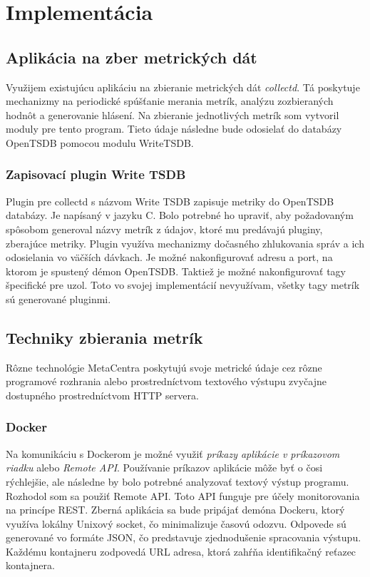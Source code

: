 \documentclass[12pt,twoside,color,cover,table]{fithesis3}
\begin{document}
\chapter{Implementácia}
\section{Aplikácia na zber metrických dát}
Využijem existujúcu aplikáciu na zbieranie metrických dát \emph{collectd}. Tá poskytuje mechanizmy na periodické spúšťanie merania metrík,
analýzu zozbieraných hodnôt a generovanie hlásení. Na zbieranie jednotlivých metrík som vytvoril moduly pre tento program. Tieto údaje následne bude odosielať do databázy OpenTSDB
pomocou modulu WriteTSDB.

\subsection{Zapisovací plugin Write TSDB}
Plugin pre collectd s názvom Write TSDB zapisuje metriky do OpenTSDB databázy.%
Je napísaný v jazyku C. Bolo potrebné ho upraviť, aby požadovaným spôsobom generoval názvy metrík z údajov, ktoré mu predávajú pluginy, zberajúce metriky. Plugin využíva mechanizmy
dočasného zhlukovania správ a ich odosielania vo väčších dávkach. Je možné nakonfigurovať adresu a port, na ktorom je spustený
démon OpenTSDB. Taktiež je možné nakonfigurovať tagy špecifické pre uzol. Toto vo svojej implementácií nevyužívam, všetky tagy metrík sú generované pluginmi.

\section{Techniky zbierania metrík}
Rôzne technológie MetaCentra poskytujú svoje metrické údaje cez rôzne programové rozhrania alebo prostredníctvom textového výstupu zvyčajne
dostupného prostredníctvom HTTP servera.

\subsection{Docker}
Na komunikáciu s Dockerom je možné využiť \textit{príkazy aplikácie v príkazovom riadku} alebo \textit{Remote API}.
Používanie príkazov aplikácie môže byť o čosi rýchlejšie, ale následne by bolo potrebné analyzovať textový výstup programu.
Rozhodol som sa použiť Remote API. Toto API funguje pre účely monitorovania na princípe REST. Zberná aplikácia sa bude pripájať demóna Dockeru, ktorý využíva lokálny Unixový socket, čo minimalizuje časovú odozvu.
Odpovede sú generované vo formáte JSON, čo predstavuje zjednodušenie spracovania výstupu. Každému kontajneru zodpovedá URL adresa, ktorá zahŕňa identifikačný reťazec kontajnera.
\end{document}
